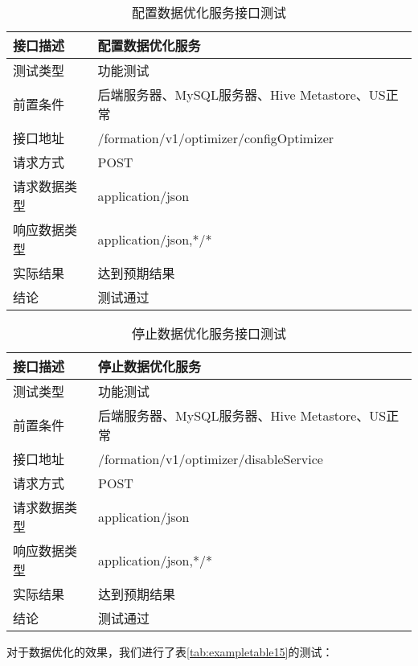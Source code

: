 \begin{table}[H]
  \centering
  \caption{配置数据优化服务接口测试}
  \label{tab:exampletable13}
  \begin{tabular}{ll}
    \toprule
    接口描述         & 配置数据优化服务         \\
    \midrule
    测试类型         & 功能测试         \\
    前置条件         & 后端服务器、MySQL服务器、Hive Metastore、US正常         \\
    接口地址       & /formation/v1/optimizer/configOptimizer        \\
    请求方式         & POST      \\
    请求数据类型         & application/json     \\
    响应数据类型         & application/json,*/*           \\
    实际结果         & 达到预期结果           \\
    结论            & 测试通过           \\
    \bottomrule
  \end{tabular}
\end{table}

\begin{table}[H]
  \centering
  \caption{停止数据优化服务接口测试}
  \label{tab:exampletable14}
  \begin{tabular}{ll}
    \toprule
    接口描述         & 停止数据优化服务         \\
    \midrule
    测试类型         & 功能测试         \\
    前置条件         & 后端服务器、MySQL服务器、Hive Metastore、US正常         \\
    接口地址       & /formation/v1/optimizer/disableService        \\
    请求方式         & POST      \\
    请求数据类型         & application/json     \\
    响应数据类型         & application/json,*/*           \\
    实际结果         & 达到预期结果           \\
    结论            & 测试通过           \\
    \bottomrule
  \end{tabular}
\end{table}

对于数据优化的效果，我们进行了表\ref{tab:exampletable15}的测试：

